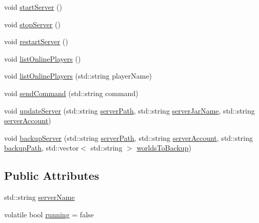 \begin{DoxyCompactItemize}
\item 
void \hyperlink{class_server_af59bb3a96b3311ed2b87e2d6899d9f79}{start\+Server} ()
\item 
void \hyperlink{class_server_a31d9bbeeaa6ced18c7096acd0b52c3ae}{stop\+Server} ()
\item 
void \hyperlink{class_server_af5dbf324376f0ee7a703876089a75abc}{restart\+Server} ()
\item 
void \hyperlink{class_server_af300244b0ce025b2699fcdcc221be563}{list\+Online\+Players} ()
\item 
void \hyperlink{class_server_ac773bd5a8ccf7e27690e252559e7846b}{list\+Online\+Players} (std\+::string player\+Name)
\item 
void \hyperlink{class_server_a461abb1e8cfeae55f4e58d97b8a4113f}{send\+Command} (std\+::string command)
\item 
void \hyperlink{class_server_ab4925438fd1c24ea6797197a1f251a37}{update\+Server} (std\+::string \hyperlink{class_server_a3435a7c091cb1184892e0a8a89838aa8}{server\+Path}, std\+::string \hyperlink{class_server_a00fa649de7a3b16e3884e7f0edb01cbc}{server\+Jar\+Name}, std\+::string \hyperlink{class_server_a1e9675de0f07622b12fa6848bc2d24b2}{server\+Account})
\item 
void \hyperlink{class_server_a0cebe27c0019b62a41109217feddbe3b}{backup\+Server} (std\+::string \hyperlink{class_server_a3435a7c091cb1184892e0a8a89838aa8}{server\+Path}, std\+::string \hyperlink{class_server_a1e9675de0f07622b12fa6848bc2d24b2}{server\+Account}, std\+::string \hyperlink{class_server_a5519da36a05003e5b724f6c0ae6a80a0}{backup\+Path}, std\+::vector$<$ std\+::string $>$ \hyperlink{class_server_ac0981101c974ac4173f98c3d2b9adc20}{worlds\+To\+Backup})
\end{DoxyCompactItemize}
\subsection*{Public Attributes}
\begin{DoxyCompactItemize}
\item 
std\+::string \hyperlink{class_server_aa96465f7e42dc0a43997e80aa002f5dc}{server\+Name}
\item 
volatile bool \hyperlink{class_server_a1f19d2430f0ac53f68b69c74abaf5477}{running} = false
\end{DoxyCompactItemize}
